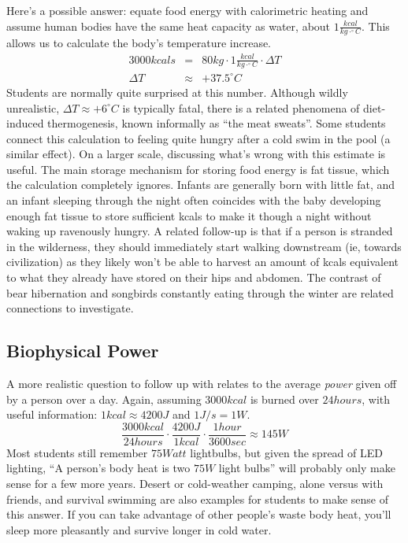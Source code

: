 \documentclass[prb,preprint]{revtex4-2}
\newcommand{\be}{\begin{equation}}
\newcommand{\ee}{\end{equation}}
\newcommand{\bea}{\begin{eqnarray}}
\newcommand{\eea}{\end{eqnarray}}
\newcommand{\degC}{^{\circ}C}
\begin{document}
Here's a possible answer:
equate food energy with calorimetric heating and assume human bodies have the same heat capacity as water, about $1\frac{kcal}{kg\cdot\degC}$. This allows us to calculate the body's temperature increase.
\bea
3000kcals &=& 80kg\cdot1 \frac{kcal}{kg\cdot \degC}\cdot\Delta T \nonumber \\
\Delta T &\approx& +37.5\degC \nonumber
\eea
Students are normally quite surprised at this number.  Although wildly unrealistic, $\Delta T \approx +6\degC$ is typically fatal, there is a related phenomena of diet-induced thermogenesis,\cite{meat_sweats} known informally as ``the meat sweats''. Some students connect this calculation to feeling quite hungry after a cold swim in the pool (a similar effect).  On a larger scale, discussing what's wrong with this estimate is useful.  The main storage mechanism for storing food energy is fat tissue, which the calculation completely ignores.  Infants are generally born with little fat, and an infant sleeping through the night often coincides with the baby developing enough fat tissue to store sufficient kcals to make it though a night without waking up ravenously hungry.  A related follow-up is that if a person is stranded in the wilderness, they should immediately start walking downstream (ie, towards civilization) as they likely won't be able to harvest an amount of kcals equivalent to what they already have stored on their hips and abdomen.\cite{trout}  The contrast of bear hibernation\cite{fat_bear} and songbirds constantly eating through the winter are related connections to investigate.

\subsection{Biophysical Power}
A more realistic question to follow up with relates to the average \textit{power} given off by a person over a day.  
Again, assuming $3000kcal$ is burned over $24 hours$, with useful information: $1 kcal \approx 4200J$ and $1 J/s=1W$.
\be
\frac{3000kcal}{24hours}\cdot\frac{4200J}{1kcal}\cdot\frac{1hour}{3600sec}\approx145W
\ee
Most students still remember $75Watt$ lightbulbs, but given the spread of LED lighting, ``A person's body heat is two $75W$ light bulbs'' will probably only make sense for a few more years.  Desert or cold-weather camping, alone versus with friends, and survival swimming are also examples for students to make sense of this answer.  If you can take advantage of other people's waste body heat, you'll sleep more pleasantly and survive longer in cold water.  
\end{document}
